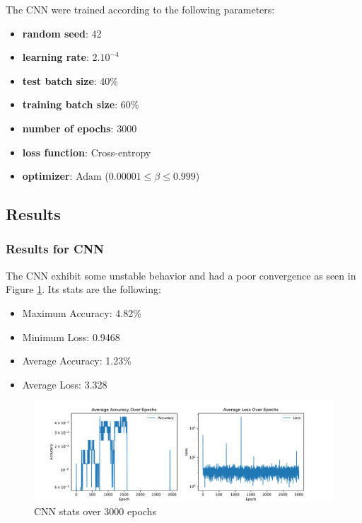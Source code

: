 			\par The CNN were trained according to the following parameters:
			\begin{itemize}
				\item \textbf{random seed}: 42
				\item \textbf{learning rate}: $2.10^{-4}$
				\item \textbf{test batch size}: 40\%
				\item \textbf{training batch size}: 60\%
				\item \textbf{number of epochs}: 3000
				\item \textbf{loss function}: Cross-entropy
				\item \textbf{optimizer}: Adam ($0.00001 \leq \beta \leq 0.999$)
			\end{itemize}
			
			\onecolumn
			
		\subsection{Results}
			\subsubsection{Results for CNN}
				\par The CNN exhibit some unstable behavior and had a poor convergence as seen in Figure \ref{fig:cnnacculoss}. Its stats are the following:
				\begin{itemize}
					\item Maximum Accuracy: 4.82\%
					\item Minimum Loss: 0.9468
					\item Average Accuracy: 1.23\%
					\item Average Loss: 3.328
				\end{itemize}
				
				\begin{figure}[H]
					\centering
					\includegraphics[width=\linewidth]{images/cnnAccuLoss}
					\caption{CNN stats over 3000 epochs}
					\label{fig:cnnacculoss}
				\end{figure}
		
